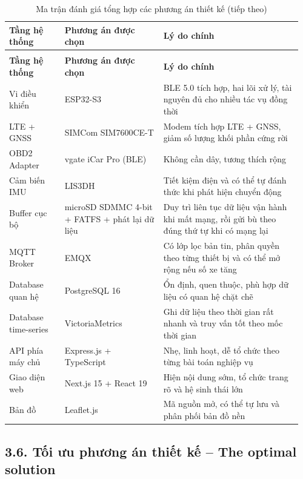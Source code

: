 \documentclass[a4paper]{extarticle}
\newcommand{\thesissettableid}[2]{%
  \renewcommand{\thetable}{#1}%
  \renewcommand{\theHtable}{#2}%
}
\begin{document}
{\thesissettableid{3.29}{tab-ch3-ma-tran-anh-gia-tong-hop-cac-phuong-an-thiet-ke}
\def\LTcaptype{table}
\begin{longtable}{|L{0.185\linewidth}|L{0.320\linewidth}|L{0.459\linewidth}|}
\caption{Ma trận đánh giá tổng hợp các phương án thiết kế}\label{tab:ch3-ma-tran-anh-gia-tong-hop-cac-phuong-an-thiet-ke}\\
\hline \textbf{Tầng hệ thống} & \textbf{Phương án được chọn} & \textbf{Lý do chính} \\
\hline
\endfirsthead
\caption[]{Ma trận đánh giá tổng hợp các phương án thiết kế (tiếp theo)}\\
\hline \textbf{Tầng hệ thống} & \textbf{Phương án được chọn} & \textbf{Lý do chính} \\
\hline
\endhead
\hline
\endfoot
\endlastfoot
Vi điều khiển & ESP32-S3 & BLE 5.0 tích hợp, hai lõi xử lý, tài nguyên đủ cho nhiều tác vụ đồng thời \\\hline
LTE + GNSS & SIMCom SIM7600CE-T & Modem tích hợp LTE + GNSS, giảm số
lượng khối phần cứng rời \\\hline
OBD2 Adapter & vgate iCar Pro (BLE) & Không cần dây, tương thích rộng \\\hline
Cảm biến IMU & LIS3DH & Tiết kiệm điện và có thể tự đánh thức khi phát
hiện chuyển động \\\hline
Buffer cục bộ & microSD SDMMC 4-bit + FATFS + phát lại dữ liệu & Duy trì liên tục
dữ liệu vận hành khi mất mạng, rồi gửi bù theo đúng thứ tự khi có mạng lại \\\hline
MQTT Broker & EMQX & Có lớp lọc bản tin, phân quyền theo từng thiết bị
và có thể mở rộng nếu số xe tăng \\\hline
Database quan hệ & PostgreSQL 16 & Ổn định, quen thuộc, phù hợp dữ liệu
có quan hệ chặt chẽ \\\hline
Database time-series & VictoriaMetrics & Ghi dữ liệu theo thời gian rất
nhanh và truy vấn tốt theo mốc thời gian \\\hline
API phía máy chủ & Express.js + TypeScript & Nhẹ, linh hoạt, dễ tổ chức theo
từng bài toán nghiệp vụ \\\hline
Giao diện web & Next.js 15 + React 19 & Hiện nội dung sớm, tổ chức trang
rõ và hệ sinh thái lớn \\\hline
Bản đồ & Leaflet.js & Mã nguồn mở, có thể tự lưu và phân phối bản đồ nền \\\hline
\end{longtable}
}


\subsection{3.6. Tối ưu phương án thiết kế -- The optimal
solution}\label{34-tux1ed1i-ux1b0u-phux1b0ux1a1ng-uxe1n-thiux1ebft-kux1ebf--the-optimal-solution}
\end{document}
